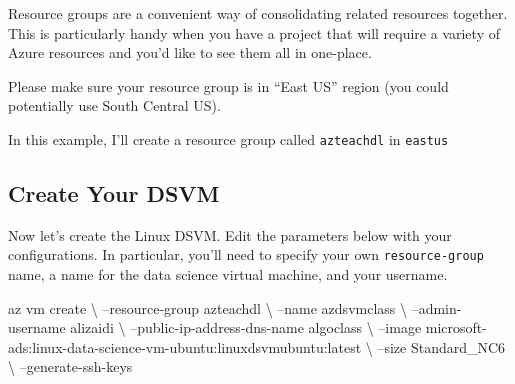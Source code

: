 \documentclass[]{book}
\newenvironment{Shaded}{\begin{snugshade}}{\end{snugshade}}
\newcommand{\KeywordTok}[1]{\textcolor[rgb]{0.13,0.29,0.53}{\textbf{#1}}}
\newcommand{\StringTok}[1]{\textcolor[rgb]{0.31,0.60,0.02}{#1}}
\newcommand{\CommentTok}[1]{\textcolor[rgb]{0.56,0.35,0.01}{\textit{#1}}}
\newcommand{\ExtensionTok}[1]{#1}
\newcommand{\NormalTok}[1]{#1}
\theoremstyle{definition}
\theoremstyle{definition}
\theoremstyle{definition}
\theoremstyle{remark}
\begin{document}
Resource groups are a convenient way of consolidating related resources
together. This is particularly handy when you have a project that will
require a variety of Azure resources and you'd like to see them all in
one-place.

Please make sure your resource group is in ``East US'' region (you could
potentially use South Central US).

In this example, I'll create a resource group called \texttt{azteachdl}
in \texttt{eastus}

\begin{Shaded}
\end{Shaded}

\subsection{Create Your DSVM}\label{create-your-dsvm}

Now let's create the Linux DSVM. Edit the parameters below with your
configurations. In particular, you'll need to specify your own
\texttt{resource-group} name, a name for the data science virtual
machine, and your username.

\begin{Shaded}
\begin{Highlighting}[]
\ExtensionTok{az}\NormalTok{ vm create \textbackslash{}}
\NormalTok{    --resource-group azteachdl \textbackslash{}}
\NormalTok{    --name azdsvmclass \textbackslash{}}
\NormalTok{    --admin-username alizaidi \textbackslash{}}
\NormalTok{    --public-ip-address-dns-name algoclass \textbackslash{}}
\NormalTok{    --image microsoft-ads:linux-data-science-vm-ubuntu:linuxdsvmubuntu:latest \textbackslash{}}
\NormalTok{    --size Standard_NC6 \textbackslash{}}
\NormalTok{    --generate-ssh-keys}
\end{Highlighting}
\end{Shaded}
\end{document}
